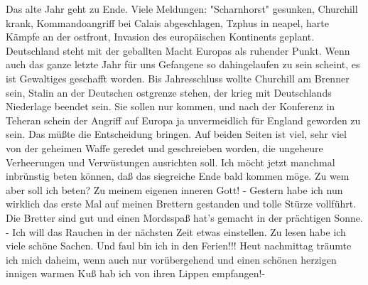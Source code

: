 \def\day{29. 12. 1943}
\mktitle

Das alte Jahr geht zu Ende.
Viele Meldungen: "Scharnhorst" gesunken, Churchill krank, Kommandoangriff bei Calais abgeschlagen, Tzphus in neapel, harte K\"{a}mpfe an der ostfront, Invasion des europ\"{a}ischen Kontinents geplant.
Deutschland steht mit der geballten Macht Europas als ruhender Punkt.
Wenn auch das ganze letzte Jahr f\"{u}r uns Gefangene so dahingelaufen zu sein scheint, es ist Gewaltiges geschafft worden.
Bis Jahresschluss wollte Churchill am Brenner sein, Stalin an der Deutschen ostgrenze stehen, der krieg mit Deutschlands Niederlage beendet sein.
Sie sollen nur kommen, und nach der Konferenz in Teheran schein der Angriff auf Europa ja unvermeidlich f\"{u}r England geworden zu sein.
Das m\"{u}{\ss}te die Entscheidung bringen.
Auf beiden Seiten ist viel, sehr viel von der geheimen Waffe geredet und geschreieben worden, die ungeheure Verheerungen und Verw\"{u}stungen ausrichten soll.
Ich m\"{o}cht jetzt manchmal inbr\"{u}nstig beten k\"{o}nnen, da{\ss} das siegreiche Ende bald kommen m\"{o}ge.
Zu wem aber soll ich beten?
Zu meinem eigenen inneren Gott!
- Gestern habe ich nun wirklich das erste Mal auf meinen Brettern gestanden und tolle St\"{u}rze vollf\"{u}hrt.
Die Bretter sind gut und einen Mordsspa{\ss} hat's gemacht in der pr\"{a}chtigen Sonne.
- Ich will das Rauchen in der n\"{a}chsten Zeit etwas einstellen.
Zu lesen habe ich viele sch\"{o}ne Sachen.
Und faul bin ich in den Ferien!!!
Heut nachmittag tr\"{a}umte ich mich daheim, wenn auch nur vor\"{u}bergehend und einen sch\"{o}nen herzigen innigen warmen Ku{\ss} hab ich von ihren Lippen empfangen!-

\clearpage
